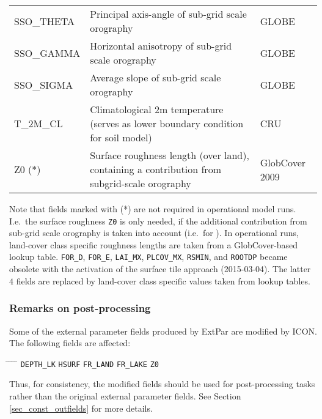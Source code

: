 \begin{longtable}{p{2.5cm}p{8.5cm}p{3.3cm}}
  SSO\_THETA                            & Principal axis-angle of sub-grid scale orography &          GLOBE           \\
  SSO\_GAMMA                            & Horizontal anisotropy of sub-grid scale orography &         GLOBE           \\
  SSO\_SIGMA                            & Average slope of sub-grid scale orography       &           GLOBE           \\
  T\_2M\_CL                             & Climatological 2m temperature (serves as lower boundary condition for soil model)  &  CRU \\
  Z0 (*)                                & Surface roughness length (over land), containing a contribution from subgrid-scale orography  & GlobCover 2009    \\                        
  \bottomrule
\end{longtable}

Note that fields marked with (*) are not required in operational model runs. I.e.\ the surface roughness \texttt{Z0} is only needed, 
if the additional contribution from sub-grid scale orography is taken into account (i.e.\ for ). In operational runs, land-cover 
class specific roughness lengths are taken from a GlobCover-based lookup table. \texttt{FOR\_D}, \texttt{FOR\_E}, \texttt{LAI\_MX}, \texttt{PLCOV\_MX}, 
\texttt{RSMIN}, and \texttt{ROOTDP} became obsolete with the activation of the surface tile approach (2015-03-04). The latter $4$ fields 
are replaced by land-cover class specific values taken from lookup tables.



\subsubsection*{Remarks on post-processing}
Some of the external parameter fields produced by ExtPar are modified by ICON. The following fields are affected: 
\begin{tabbing}
\hspace{0.20\textwidth} \= \hspace{0.20\textwidth} \= \hspace{0.20\textwidth} \= \hspace{0.20\textwidth} \= \hspace{0.20\textwidth} \kill
\texttt{DEPTH\_LK}  \>
\texttt{HSURF} \>
\texttt{FR\_LAND} \>
\texttt{FR\_LAKE} \>
\texttt{Z0}
\end{tabbing}
Thus, for consistency, the modified fields should be used for post-processing tasks rather than the original external parameter fields. 
See Section \ref{sec_const_outfields} for more details.
